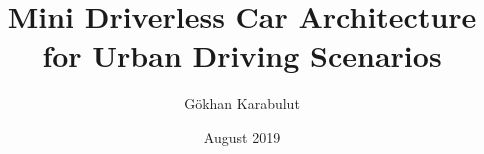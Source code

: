 \documentclass[chaparabic,ceng,ms,12pt,oneandhalf]{metu}
\author{Gökhan Karabulut}
\title{Mini Driverless Car Architecture for Urban Driving Scenarios}
\date{August 2019}
\begin{document}
\begin{preliminaries}


\end{preliminaries}
%
%
%

\setlength{\parindent}{0em}
\setlength{\parskip}{10pt}












%
%

% 

% 
\end{document}
